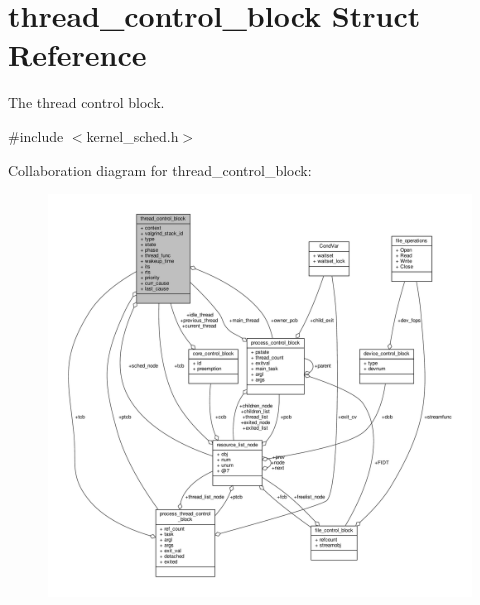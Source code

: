\hypertarget{structthread__control__block}{}\section{thread\+\_\+control\+\_\+block Struct Reference}
\label{structthread__control__block}


The thread control block.  




{\ttfamily \#include $<$kernel\+\_\+sched.\+h$>$}



Collaboration diagram for thread\+\_\+control\+\_\+block\+:
\nopagebreak
\begin{figure}[H]
\begin{center}
\leavevmode
\includegraphics[width=350pt]{structthread__control__block__coll__graph}
\end{center}
\end{figure}

